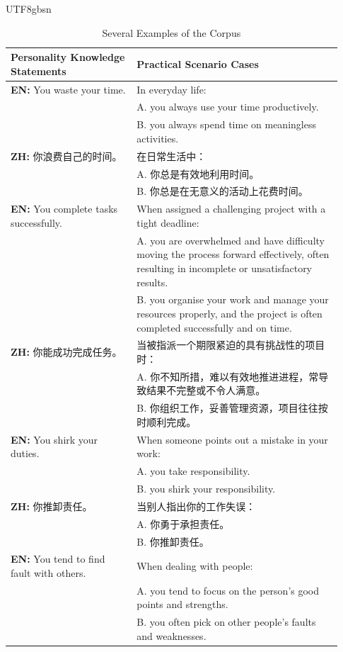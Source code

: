 \documentclass{article}
\theoremstyle{plain}
\theoremstyle{definition}
\theoremstyle{remark}
\begin{document}
\begin{CJK*}{UTF8}{gbsn}
\begin{table}[!htbp]\small
\caption{\label{table-example} Several Examples of the Corpus
}
\vskip 0.15in
\centering
\begin{tabular}{p{0.35\linewidth} | p{0.58\linewidth}}
\hline
\textbf{Personality Knowledge Statements} & \textbf{Practical Scenario Cases}\\
\hline
\textbf{EN:} You waste your time. & In everyday life:  \\
  & A. you always use your time productively. \\
  & B. you always spend time on meaningless activities. \\
\textbf{ZH:} 你浪费自己的时间。 &  在日常生活中： \\
  & A. 你总是有效地利用时间。 \\
  & B. 你总是在无意义的活动上花费时间。 \\
\hline
\textbf{EN:} You complete tasks successfully. & When assigned a challenging project with a tight deadline:  \\
  & A. you are overwhelmed and have difficulty moving the process forward effectively, often resulting in incomplete or unsatisfactory results. \\
  & B. you organise your work and manage your resources properly, and the project is often completed successfully and on time. \\
\textbf{ZH:} 你能成功完成任务。 &  当被指派一个期限紧迫的具有挑战性的项目时： \\
  & A. 你不知所措，难以有效地推进进程，常导致结果不完整或不令人满意。 \\
  & B. 你组织工作，妥善管理资源，项目往往按时顺利完成。 \\
\hline
\textbf{EN:} You shirk your duties. & When someone points out a mistake in your work:  \\
  & A. you take responsibility. \\
  & B. you shirk your responsibility. \\
\textbf{ZH:} 你推卸责任。 &  当别人指出你的工作失误： \\
  & A. 你勇于承担责任。 \\
  & B. 你推卸责任。 \\
\hline
\textbf{EN:} You tend to find fault with others. & When dealing with people: \\
  & A. you tend to focus on the person's good points and strengths. \\
  & B. you often pick on other people's faults and weaknesses. \\

\end{tabular}
\end{table}
\end{CJK*}
\end{document}

